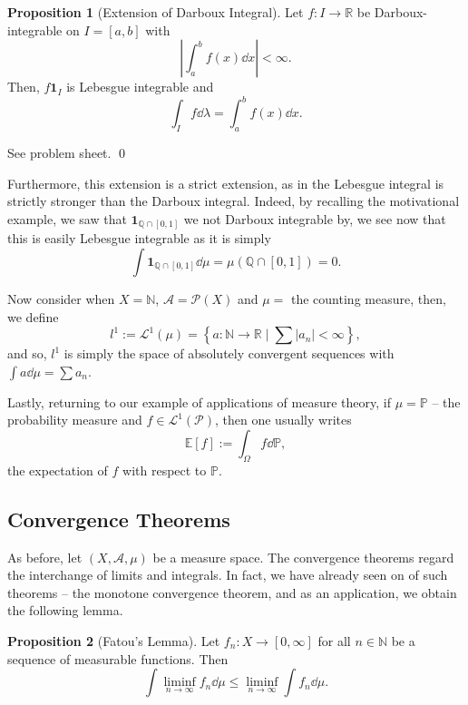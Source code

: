 \documentclass[
]{article}
\theoremstyle{definition}
\newtheorem{prop}{Proposition}
\theoremstyle{definition}
\begin{document}
\begin{prop}[Extension of Darboux Integral]
  Let \(f : I \to \mathbb{R}\) be Darboux-integrable on \(I = [a, b]\) with 
  \[\left|\int_a^b f(x) \dd x\right| < \infty.\]
  Then, \(f\mathbf{1}_I\) is Lebesgue integrable and 
  \[\int_I f \dd \lambda = \int_a^b f(x) \dd x.\]
\end{prop}
\proof

See problem sheet. \qed

Furthermore, this extension is a strict extension, as in the Lebesgue
integral is strictly stronger than the Darboux integral. Indeed, by
recalling the motivational example, we saw that
\(\mathbf{1}_{\mathbb{Q} \cap [0, 1]}\) we not Darboux integrable by, we
see now that this is easily Lebesgue integrable as it is simply
\[\int \mathbf{1}_{\mathbb{Q} \cap [0, 1]} \dd \mu = \mu(\mathbb{Q} \cap [0, 1]) = 0.\]

Now consider when \(X = \mathbb{N}\), \(\mathcal{A} = \mathcal{P}(X)\)
and \(\mu =\) the counting measure, then, we define
\[l^1 := \mathcal{L}^1(\mu) = \left\{ a : \mathbb{N} \to \mathbb{R} \mid
 \sum |a_n| < \infty\right\},\] and so, \(l^1\) is simply the space of
absolutely convergent sequences with \(\int a \dd \mu = \sum a_n\).

Lastly, returning to our example of applications of measure theory, if
\(\mu = \mathbb{P}\) -- the probability measure and
\(f \in \mathcal{L}^1(\mathcal{P})\), then one usually writes
\[\mathbb{E}[f] := \int_\Omega f \dd \mathbb{P},\] the expectation of
\(f\) with respect to \(\mathbb{P}\).

\hypertarget{convergence-theorems}{%
\subsection{Convergence Theorems}\label{convergence-theorems}}

As before, let \((X, \mathcal{A}, \mu)\) be a measure space. The
convergence theorems regard the interchange of limits and integrals. In
fact, we have already seen on of such theorems -- the monotone
convergence theorem, and as an application, we obtain the following
lemma.

\begin{prop}[Fatou's Lemma]
  Let \(f_n : X \to [0, \infty]\) for all \(n \in \mathbb{N}\) be a sequence 
  of measurable functions. Then 
  \[\int \liminf_{n \to \infty} f_n \dd \mu \le \liminf_{n \to \infty} \int f_n \dd \mu.\]
\end{prop}
\proof
\end{document}

